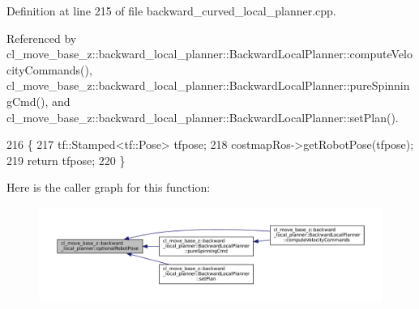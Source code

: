 Definition at line 215 of file backward\+\_\+curved\+\_\+local\+\_\+planner.\+cpp.



Referenced by cl\+\_\+move\+\_\+base\+\_\+z\+::backward\+\_\+local\+\_\+planner\+::\+Backward\+Local\+Planner\+::compute\+Velocity\+Commands(), cl\+\_\+move\+\_\+base\+\_\+z\+::backward\+\_\+local\+\_\+planner\+::\+Backward\+Local\+Planner\+::pure\+Spinning\+Cmd(), and cl\+\_\+move\+\_\+base\+\_\+z\+::backward\+\_\+local\+\_\+planner\+::\+Backward\+Local\+Planner\+::set\+Plan().


\begin{DoxyCode}
216         \{
217             tf::Stamped<tf::Pose> tfpose;
218             costmapRos->getRobotPose(tfpose);
219             \textcolor{keywordflow}{return} tfpose;
220         \}
\end{DoxyCode}
Here is the caller graph for this function\+:
\nopagebreak
\begin{figure}[H]
\begin{center}
\leavevmode
\includegraphics[width=350pt]{namespacecl__move__base__z_1_1backward__local__planner_afd5bb2a0d144f7b89f4215fbcb1fbe69_icgraph}
\end{center}
\end{figure}
